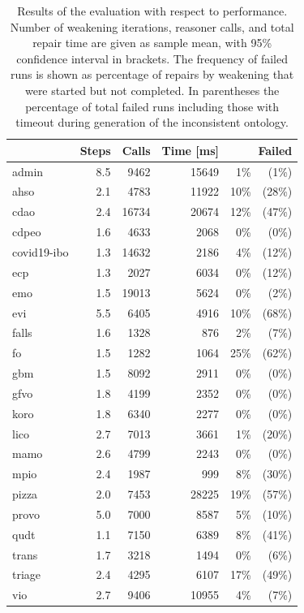 \begin{table}[ht]
  \scriptsize
  \centering
  \begin{tabular}{|l|rrrr@{ }r|}
    \cline{2-6}
    \multicolumn{1}{l|}{} & Steps & Calls & Time [ms] & \multicolumn{2}{r|}{Failed} \\
    \hline
    admin & 8.5 & 9462 & 15649 & 1\% & (1\%) \\
    ahso & 2.1 & 4783 & 11922 & 10\% & (28\%) \\
    cdao & 2.4 & 16734 & 20674 & 12\% & (47\%) \\
    cdpeo & 1.6 & 4633 & 2068 & 0\% & (0\%) \\
    covid19-ibo & 1.3 & 14632 & 2186 & 4\% & (12\%) \\
    ecp & 1.3 & 2027 & 6034 & 0\% & (12\%) \\
    emo & 1.5 & 19013 & 5624 & 0\% & (2\%) \\
    evi & 5.5 & 6405 & 4916 & 10\% & (68\%) \\
    falls & 1.6 & 1328 & 876 & 2\% & (7\%) \\
    fo & 1.5 & 1282 & 1064 & 25\% & (62\%) \\
    gbm & 1.5 & 8092 & 2911 & 0\% & (0\%) \\
    gfvo & 1.8 & 4199 & 2352 & 0\% & (0\%) \\
    koro & 1.8 & 6340 & 2277 & 0\% & (0\%) \\
    lico & 2.7 & 7013 & 3661 & 1\% & (20\%) \\
    mamo & 2.6 & 4799 & 2243 & 0\% & (0\%) \\
    mpio & 2.4 & 1987 & 999 & 8\% & (30\%) \\
    pizza & 2.0 & 7453 & 28225 & 19\% & (57\%) \\
    provo & 5.0 & 7000 & 8587 & 5\% & (10\%) \\
    qudt & 1.1 & 7150 & 6389 & 8\% & (41\%) \\
    trans & 1.7 & 3218 & 1494 & 0\% & (6\%) \\
    triage & 2.4 & 4295 & 6107 & 17\% & (49\%) \\
    vio & 2.7 & 9406 & 10955 & 4\% & (7\%) \\
    \hline
  \end{tabular}
  \caption{Results of the evaluation with respect to performance. Number of weakening iterations, reasoner calls, and total repair time are given as sample mean, with 95\% confidence interval in brackets. The frequency of failed runs is shown as percentage of repairs by weakening that were started but not completed. In parentheses the percentage of total failed runs including those with timeout during generation of the inconsistent ontology.}
  \label{table:results-perf}
\end{table}

